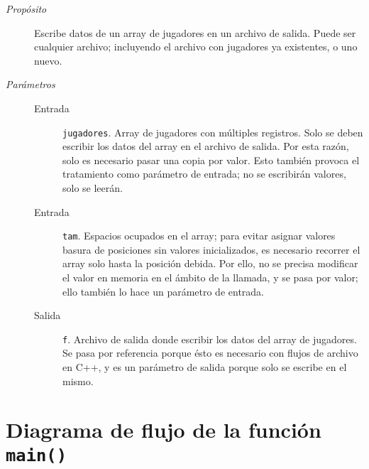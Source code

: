\documentclass[12pt]{article}
\begin{document}
\begin{description}

\item[\emph{Propósito}]

Escribe datos de un array de jugadores en un archivo de salida. Puede ser
cualquier archivo; incluyendo el archivo con jugadores ya existentes, o uno
nuevo.

\item[\emph{Parámetros}] \leavevmode

\begin{description}

\item[Entrada] \texttt{jugadores}. Array de jugadores con múltiples
registros. Solo se deben escribir los datos del array en el archivo de salida.
Por esta razón, solo es necesario pasar una copia por valor. Esto también
provoca el tratamiento como parámetro de entrada; no se escribirán valores, solo
se leerán.

\item[Entrada] \texttt{tam}. Espacios ocupados en el array; para evitar
asignar valores basura de posiciones sin valores inicializados, es necesario
recorrer el array solo hasta la posición debida. Por ello, no se precisa
modificar el valor en memoria en el ámbito de la llamada, y se pasa por valor;
ello también lo hace un parámetro de entrada.

\item[Salida] \texttt{f}. Archivo de salida donde escribir los datos
del array de jugadores. Se pasa por referencia porque ésto es necesario con
flujos de archivo en C++, y es un parámetro de salida porque solo se escribe en
el mismo.

\end{description}

\end{description}

\clearpage

\section*{Diagrama de flujo de la función \texttt{main()}}
\end{document}
